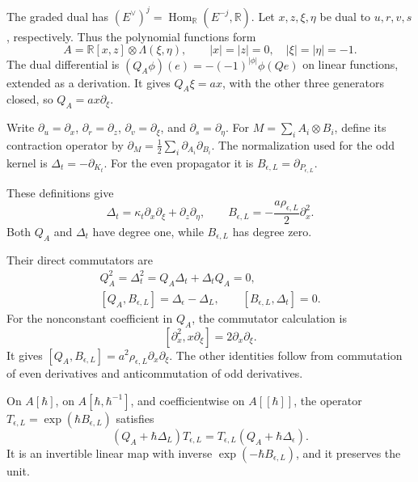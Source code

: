 The graded dual has
$(E^\vee)^j=\operatorname{Hom}_{\mathbb R}(E^{-j},\mathbb R)$.
Let $x,z,\xi,\eta$ be dual to $u,r,v,s$, respectively.
Thus the polynomial functions form
\[
 A=\mathbb R[x,z]\otimes\Lambda(\xi,\eta),
 \qquad |x|=|z|=0,\quad |\xi|=|\eta|=-1.
\]
The dual differential is
$(Q_A\phi)(e)=-(-1)^{|\phi|}\phi(Qe)$ on linear functions,
extended as a derivation. It gives $Q_A\xi=ax$, with the other
three generators closed, so $Q_A=ax\partial_\xi$.

Write $\partial_u=\partial_x$, $\partial_r=\partial_z$,
$\partial_v=\partial_\xi$, and $\partial_s=\partial_\eta$.
For $M=\sum_i A_i\otimes B_i$, define its contraction operator by
$\partial_M=\tfrac12\sum_i\partial_{A_i}\partial_{B_i}$.
The normalization used for the odd kernel is $\Delta_t=-\partial_{K_t}$.
For the even propagator it is $B_{\epsilon,L}=\partial_{P_{\epsilon,L}}$.

These definitions give
\begin{equation}\label{eq:gaussian-scale-operators}
 \Delta_t=\kappa_t\partial_x\partial_\xi+
                    \partial_z\partial_\eta,
 \qquad
 B_{\epsilon,L}=-\frac{a\rho_{\epsilon,L}}2\partial_x^2.
\end{equation}
Both $Q_A$ and $\Delta_t$ have degree one, while $B_{\epsilon,L}$
has degree zero.

Their direct commutators are
\begin{equation}\label{eq:gaussian-scale-commutators}
 \begin{gathered}
 Q_A^2=\Delta_t^2=Q_A\Delta_t+\Delta_tQ_A=0,\\
 [Q_A,B_{\epsilon,L}]=\Delta_\epsilon-\Delta_L,
 \qquad [B_{\epsilon,L},\Delta_t]=0.
 \end{gathered}
\end{equation}
For the nonconstant coefficient in $Q_A$, the commutator calculation is
\[
 [\partial_x^2,x\partial_\xi]=2\partial_x\partial_\xi.
\]
It gives
$[Q_A,B_{\epsilon,L}]=a^2\rho_{\epsilon,L}\partial_x\partial_\xi$.
The other identities follow from commutation of even derivatives and
anticommutation of odd derivatives.

\begin{proposition}\label{prop:gaussian-intertwining}
On $A[\hbar]$, on $A[\hbar,\hbar^{-1}]$, and coefficientwise on
$A[[\hbar]]$, the operator
$T_{\epsilon,L}=\exp(\hbar B_{\epsilon,L})$ satisfies
\begin{equation}\label{eq:gaussian-intertwining}
 (Q_A+\hbar\Delta_L)T_{\epsilon,L}
 =T_{\epsilon,L}(Q_A+\hbar\Delta_\epsilon).
\end{equation}
It is an invertible linear map with inverse
$\exp(-\hbar B_{\epsilon,L})$, and it preserves the unit.
\end{proposition}

